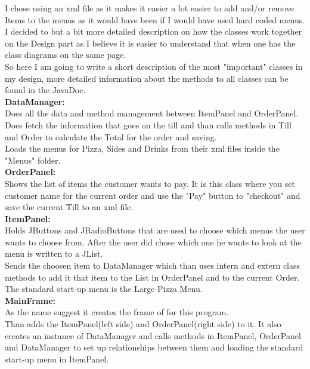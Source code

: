 \documentclass[11pt,a4paper]{article}
\begin{document}
\begin{flushleft}
I chose using an xml file as it makes it easier a lot easier to add and/or remove  Items to the menus as it would have been if I would have used hard coded menus. \\
I decided to but a bit more detailed description on how the classes work together on the Design part as I believe it is easier to understand that when one has the class diagrams on the same page. \\
So here I am going to write a short description of the most "important" classes in my design, more detailed information about the methods to all classes can be found in the JavaDoc.\\
\vspace{11pt}
\textbf{DataManager:}\\
Does all the data and method management between ItemPanel and OrderPanel.\\
Does fetch the information that goes on the till and than calls methods in Till and Order to calculate the Total for the order and saving.\\
Loads the menus for Pizza, Sides and Drinks from their xml files inside the "Menus" folder.\\   
\vspace{11pt}
\textbf{OrderPanel:}\\
Shows the list of items the customer wants to pay. It is this class where you set customer name for the current order and use the "Pay" button to "checkout" and save the current Till to an xml file. \\
\vspace{11pt}
\textbf{ItemPanel:}\\
Holds JButtons and JRadioButtons that are used to choose which menus the user wants to choose from. After the user did chose which one he wants to look at the menu is written to a JList.\\Sends the choosen item to DataManager which than uses intern and extern class methods to add it that item to the List in OrderPanel and to the current Order.\\
The standard start-up menu is the Large Pizza Menu. \\
\vspace{11pt}
\textbf{MainFrame:}\\
As the name suggest it creates the frame of for this program.\\
Than adds the ItemPanel(left side) and OrderPanel(right side) to it. It also creates an instance of DataManager and calls methods in ItemPanel, OrderPanel and DataManager to set up relationships between them and loading the standard start-up menu in ItemPanel.\\

\end{flushleft}
\end{document}
